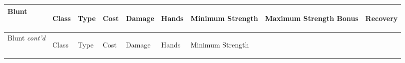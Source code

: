 \documentclass[twoside]{book}
\begin{document}
\begin{longtable}{p{1.25in}llllp{2em}p{3em}p{3em}l} 
  Blunt
  &
  \begin{turn}{70}{Class}\end{turn}
          
  &
  \begin{turn}{70}{Type}\end{turn}
          
  &
  \begin{turn}{70}{Cost}\end{turn}
          
  &
  \begin{turn}{70}{Damage}\end{turn}
          
  &
  \begin{turn}{70}{Hands}\end{turn}
          
  &
  \begin{turn}{70}{Minimum Strength}\end{turn}
          
  &
  \begin{turn}{70}{Maximum Strength Bonus}\end{turn}
          
  &
  \begin{turn}{70}{Recovery}\end{turn}
          
  \\
  \hline
  \hline
  \endfirsthead
  Blunt \textit{cont'd}
        
  &
  \begin{turn}{70}{Class}\end{turn}
          
  &
  \begin{turn}{70}{Type}\end{turn}
          
  &
  \begin{turn}{70}{Cost}\end{turn}
          
  &
  \begin{turn}{70}{Damage}\end{turn}
          
  &
  \begin{turn}{70}{Hands}\end{turn}
          
  &
  \begin{turn}{70}{Minimum Strength}\end{turn}
          

\end{longtable}
\end{document}
